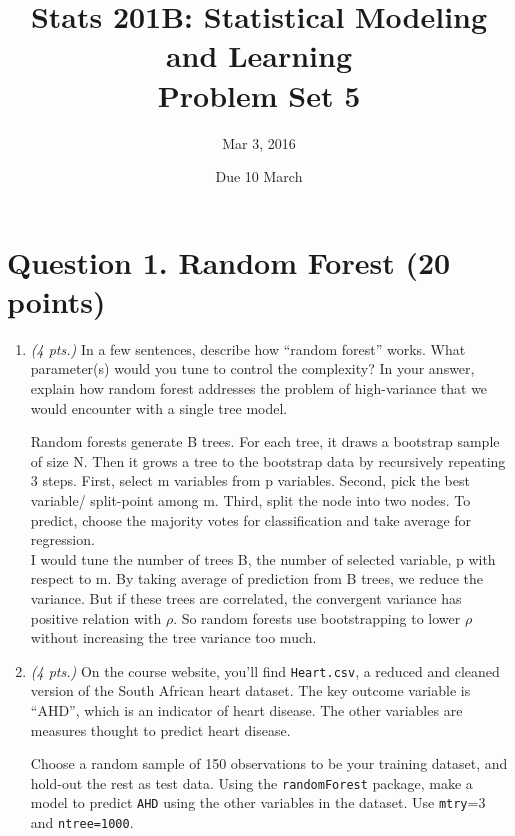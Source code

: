 \documentclass[11pt,english]{article}
\begin{document}
\title{\textbf{Stats 201B: Statistical Modeling and Learning}\\
\textbf{Problem Set 5}}
\author{Mar 3, 2016}

\date{Due 10 March}
\maketitle


\section*{Question 1. Random Forest (20 points)}

\begin{enumerate}
\item \textit{(4 pts.)} In a few sentences, describe how ``random forest'' works. What parameter(s) would you tune to control the complexity? In your answer, explain how random forest addresses the problem of high-variance that we would encounter with a single tree model.\par

\hspace{2em} Random forests generate B trees.  For each tree, it draws a bootstrap sample of size N.  Then it grows a tree to the bootstrap data by recursively repeating 3 steps.  First, select m variables from p variables.  Second, pick the best variable/ split-point among m.  Third, split the node into two nodes.  To predict, choose the majority votes for classification and take average for regression.\\  I would tune the number of trees B, the number of selected variable, p with respect to m.  By taking average of prediction from B trees, we reduce the variance.  But if these trees are correlated, the convergent variance has positive relation with $\rho$.  So random forests use bootstrapping to lower $\rho$ without increasing the tree variance too much.


\bigskip
\item \textit{(4 pts.)} On the course website, you'll find \texttt{Heart.csv}, a reduced and cleaned version of the South African heart dataset. The key outcome variable is ``AHD'', which is an indicator of heart disease. The other variables are measures thought to predict heart disease.\par
\hspace{2em}

Choose a random sample of 150 observations to be your training dataset, and hold-out the rest as test data. Using the \texttt{randomForest} package, make a model to predict \texttt{AHD} using the other variables in the dataset. Use \texttt{mtry}=3 and \texttt{ntree=1000}.


\end{enumerate}
\end{document}
